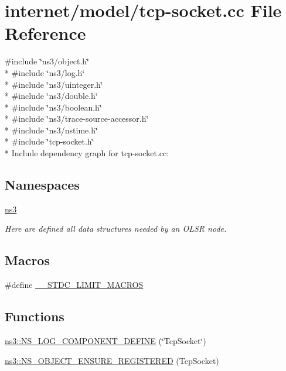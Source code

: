 \hypertarget{tcp-socket_8cc}{}\section{internet/model/tcp-\/socket.cc File Reference}
\label{tcp-socket_8cc}
{\ttfamily \#include \char`\"{}ns3/object.\+h\char`\"{}}\\*
{\ttfamily \#include \char`\"{}ns3/log.\+h\char`\"{}}\\*
{\ttfamily \#include \char`\"{}ns3/uinteger.\+h\char`\"{}}\\*
{\ttfamily \#include \char`\"{}ns3/double.\+h\char`\"{}}\\*
{\ttfamily \#include \char`\"{}ns3/boolean.\+h\char`\"{}}\\*
{\ttfamily \#include \char`\"{}ns3/trace-\/source-\/accessor.\+h\char`\"{}}\\*
{\ttfamily \#include \char`\"{}ns3/nstime.\+h\char`\"{}}\\*
{\ttfamily \#include \char`\"{}tcp-\/socket.\+h\char`\"{}}\\*
Include dependency graph for tcp-\/socket.cc\+:
\subsection*{Namespaces}
\begin{DoxyCompactItemize}
\item 
 \hyperlink{namespacens3}{ns3}
\begin{DoxyCompactList}\small\item\em Here are defined all data structures needed by an O\+L\+SR node. \end{DoxyCompactList}\end{DoxyCompactItemize}
\subsection*{Macros}
\begin{DoxyCompactItemize}
\item 
\#define \hyperlink{tcp-socket_8cc_aeb7e7a856ab7a794b05b6b63ef36ea3e}{\+\_\+\+\_\+\+S\+T\+D\+C\+\_\+\+L\+I\+M\+I\+T\+\_\+\+M\+A\+C\+R\+OS}
\end{DoxyCompactItemize}
\subsection*{Functions}
\begin{DoxyCompactItemize}
\item 
\hyperlink{namespacens3_ab7460ee3a3a7744e0fad0ea40be29548}{ns3\+::\+N\+S\+\_\+\+L\+O\+G\+\_\+\+C\+O\+M\+P\+O\+N\+E\+N\+T\+\_\+\+D\+E\+F\+I\+NE} (\char`\"{}Tcp\+Socket\char`\"{})
\item 
\hyperlink{namespacens3_aee132a2bcb2423e0b6d0f9d7dcecf38f}{ns3\+::\+N\+S\+\_\+\+O\+B\+J\+E\+C\+T\+\_\+\+E\+N\+S\+U\+R\+E\+\_\+\+R\+E\+G\+I\+S\+T\+E\+R\+ED} (Tcp\+Socket)
\end{DoxyCompactItemize}


